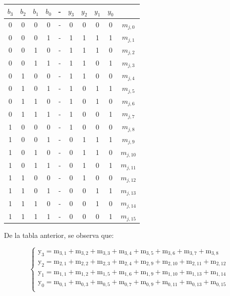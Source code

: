 \documentclass[../../informe/src/main.tex]{subfiles}
\begin{document}
\begin{enumerate}
\begin{table}[H]
\centering
 \begin{tabular}{||c c c c c c c c c c||} 
 \hline
$b_{3}$ & $b_{2}$ & $b_{1}$ & $b_{0}$ & - & $y_{3}$ & $y_{2}$ & $y_{1}$ & $y_{0}$\\ [0.5ex] 
 \hline\hline
 0 & 0 & 0 & 0 & - & 0 & 0 & 0 & 0 & $m_{j,0}$\\
0 & 0 & 0 & 1 & - & 1 & 1 & 1 & 1 & $m_{j,1}$\\
0 & 0 & 1 & 0 & - & 1 & 1 & 1 & 0 & $m_{j,2}$\\
0 & 0 & 1 & 1 & - & 1 & 1 & 0 & 1 & $m_{j,3}$\\
0 & 1 & 0 & 0 & - & 1 & 1 & 0 & 0 & $m_{j,4}$\\
0 & 1 & 0 & 1 & - & 1 & 0 & 1 & 1 & $m_{j,5}$\\
0 & 1 & 1 & 0 & - & 1 & 0 & 1 & 0 & $m_{j,6}$\\
0 & 1 & 1 & 1 & - & 1 & 0 & 0 & 1 & $m_{j,7}$\\
1 & 0 & 0 & 0 & - & 1 & 0 & 0 & 0 & $m_{j,8}$\\
1 & 0 & 0 & 1 & - & 0 & 1 & 1 & 1 & $m_{j,9}$\\
1 & 0 & 1 & 0 & - & 0 & 1 & 1 & 0 & $m_{j,10}$\\
1 & 0 & 1 & 1 & - & 0 & 1 & 0 & 1 & $m_{j,11}$\\
1 & 1 & 0 & 0 & - & 0 & 1 & 0 & 0 & $m_{j,12}$\\
1 & 1 & 0 & 1 & - & 0 & 0 & 1 & 1 & $m_{j,13}$\\
1 & 1 & 1 & 0 & - & 0 & 0 & 1 & 0 & $m_{j,14}$\\
1 & 1 & 1 & 1 & - & 0 & 0 & 0 & 1 & $m_{j,15}$\\[1ex] 
\hline
 \end{tabular}
\end{table}

De la tabla anterior, se observa que:

	 \begin{equation} 
  	   \left\{
	  	    \begin{array}{ll}
		 					\mathrm{y_3} = \mathrm{m_{3,1}+ m_{3,2}+ m_{3,3}+ m_{3,4}+ m_{3,5}+ m_{3,6}+ m_{3,7}+ m_{3,8}} \\
		 					\mathrm{y_2} = \mathrm{m_{2,1}+ m_{2,2}+ m_{2,3}+ m_{2,4}+ m_{2,9}+ m_{2,10}+ m_{2,11}+ m_{2,12}} \\
		 					\mathrm{y_1} = \mathrm{m_{1,1}+ m_{1,2}+ m_{1,5}+ m_{1,6}+ m_{1,9}+ m_{1,10}+ m_{1,13}+ m_{1,14}} \\
		 					\mathrm{y_0} = \mathrm{m_{0,1}+ m_{0,3}+ m_{0,5}+ m_{0,7}+ m_{0,9}+ m_{0,11}+ m_{0,13}+ m_{0,15}} \\
	     	 \end{array}
	     	\right.
 	\end{equation}
 	

\end{enumerate}
\end{document}
